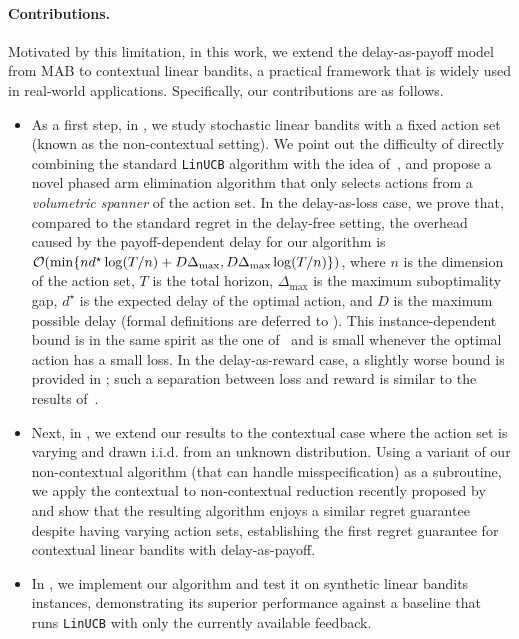 \paragraph{Contributions.} 
Motivated by this limitation, in this work, we extend the delay-as-payoff model from MAB to contextual linear bandits, a practical framework that is widely used in real-world applications.  Specifically, our contributions are as follows.
\begin{itemize}[leftmargin=*]
    \item As a first step, in , we study stochastic linear bandits with a fixed action set (known as the non-contextual setting).
    We point out the difficulty of directly combining the standard \texttt{LinUCB} algorithm with the idea of~\citet{schlisselberg2024delay},
    and propose a novel phased arm elimination algorithm that  only selects actions from a \emph{volumetric spanner} of the action set.
    In the delay-as-loss case, we prove that, compared to the standard regret in the delay-free setting, the overhead caused by the payoff-dependent delay for our algorithm is 
    $\mathcal{O}(\min\{nd^\star
    \log(T/n)+D\Delta_{\max}, D\Delta_{\max}\log(T/n)\})$, where $n$ is the dimension of the action set, $T$ is the total horizon, $\Delta_{\max}$ is the maximum suboptimality gap,
    $d^\star$ is the expected delay of the optimal action,
    and $D$ is the maximum possible delay
    (formal definitions are deferred to ). 
    This instance-dependent bound is in the same spirit as the one of~\citet{schlisselberg2024delay} and is small whenever the optimal action has a small loss.
    In the delay-as-reward case, a slightly worse bound is provided in ; such a separation between loss and reward is similar to the results of~\citet{schlisselberg2024delay}.
    
    \item Next, in , we extend our results to the contextual case where the action set is varying and drawn i.i.d. from an unknown distribution. 
    Using a variant of our non-contextual algorithm (that can handle misspecification) as a subroutine,    
    we apply the contextual to non-contextual reduction recently proposed by \citep{hanna2023contexts} and show that the resulting algorithm enjoys a similar regret guarantee despite having varying action sets, establishing the first regret guarantee for contextual linear bandits with delay-as-payoff.

    
    \item In , we implement our algorithm and test it on synthetic linear bandits instances, demonstrating its superior performance against a baseline that runs \texttt{LinUCB} with only the currently available feedback.
\end{itemize}

